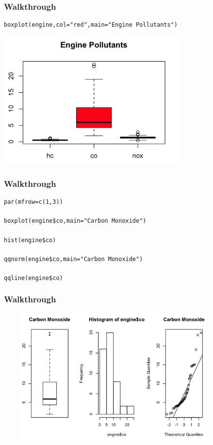 \documentclass{beamer}
\begin{document}
\begin{frame}[fragile]
\frametitle{Walkthrough}

\footnotesize
\begin{verbatim}
boxplot(engine,col="red",main="Engine Pollutants")

\end{verbatim}
\begin{center}
\includegraphics[height=7cm]{../IMG/pollute.png}
\end{center}
\end{frame}


\begin{frame}[fragile]
\frametitle{Walkthrough}

\small
\begin{verbatim}
par(mfrow=c(1,3))

boxplot(engine$co,main="Carbon Monoxide")

hist(engine$co)

qqnorm(engine$co,main="Carbon Monoxide")

qqline(engine$co)

\end{verbatim}
\begin{center}
\end{center}
\end{frame}


\begin{frame}[fragile]
\frametitle{Walkthrough}

\begin{center}
\includegraphics[width=12cm,height=7cm]{../IMG/3plot.png}
\end{center}
\end{frame}
\end{document}
